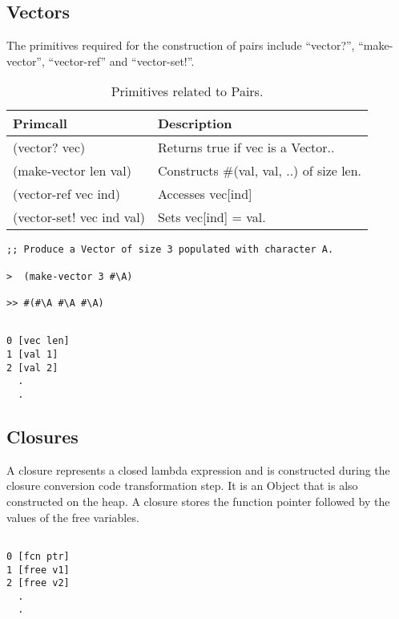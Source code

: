 \documentclass{article}
\begin{document}
\subsection{Vectors}

The primitives required for the construction of pairs include ``vector?'', ``make-vector'', ``vector-ref'' and ``vector-set!''. 

\begin{table}[ht]
  \centering
\begin{tabular}{ l l }
  \toprule
  Primcall & Description \\ \hline
  \midrule
  (vector? vec) & Returns true if vec is a Vector.. \\
  (make-vector len val) & Constructs \#(val, val, ..) of size len. \\
  (vector-ref vec ind) & Accesses vec[ind] \\
  (vector-set! vec ind val) & Sets vec[ind] = val. \\
  \bottomrule
\end{tabular}
\caption{Primitives related to Pairs.} \label{tab:vectors}
\end{table}

\begin{verbatim}
;; Produce a Vector of size 3 populated with character A.

>  (make-vector 3 #\A) 

>> #(#\A #\A #\A)
\end{verbatim}


\begin{verbatim}

0 [vec len]
1 [val 1]
2 [val 2]
  .
  .

\end{verbatim}

\subsection{Closures}

A closure represents a closed lambda expression and is constructed during the closure conversion code transformation step. It is an Object that is also constructed on the heap. A closure stores the function pointer followed by the values of the free variables.

\begin{verbatim}

0 [fcn ptr]
1 [free v1]
2 [free v2]
  .
  .

\end{verbatim}
\end{document}
